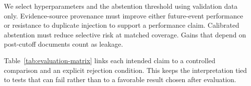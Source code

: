 We select hyperparameters and the abstention threshold using validation data only. Evidence-source provenance must improve either future-event performance or resistance to duplicate injection to support a performance claim. Calibrated abstention must reduce selective risk at matched coverage. Gains that depend on post-cutoff documents count as leakage.

Table~\ref{tab:evaluation-matrix} links each intended claim to a controlled comparison and an explicit rejection condition. This keeps the interpretation tied to tests that can fail rather than to a favorable result chosen after evaluation.



